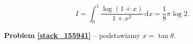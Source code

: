 %

\begin{problem}[pytanie 155941]
    \label{stack_155941}%
    \begin{equation}
        I = \int_0^1 \frac{\log (1+x)}{1 + x^2} \,\mathrm{d}x = \frac 1 8 \pi \log 2.
    \end{equation}
\end{problem}

\textbf{Problem \ref{stack_155941}} -- podstawiamy $x = \tan \theta$. %

%